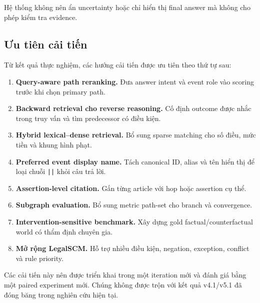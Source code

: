 Hệ thống không nên ẩn uncertainty hoặc chỉ hiển thị final answer mà không
cho phép kiểm tra evidence.

\subsection{Ưu tiên cải tiến}

Từ kết quả thực nghiệm, các hướng cải tiến được ưu tiên theo thứ tự sau:

\begin{enumerate}
    \item \textbf{Query-aware path reranking.}
    Đưa answer intent và event role vào scoring trước khi chọn primary path.

    \item \textbf{Backward retrieval cho reverse reasoning.}
    Cố định outcome được nhắc trong truy vấn và tìm predecessor có điều kiện.

    \item \textbf{Hybrid lexical--dense retrieval.}
    Bổ sung sparse matching cho số điều, mức tiền và khung hình phạt.

    \item \textbf{Preferred event display name.}
    Tách canonical ID, alias và tên hiển thị để loại chuỗi
    \texttt{||} khỏi câu trả lời.

    \item \textbf{Assertion-level citation.}
    Gắn từng article với hop hoặc assertion cụ thể.

    \item \textbf{Subgraph evaluation.}
    Bổ sung metric path-set cho branch và convergence.

    \item \textbf{Intervention-sensitive benchmark.}
    Xây dựng gold factual/counterfactual world có thẩm định chuyên gia.

    \item \textbf{Mở rộng LegalSCM.}
    Hỗ trợ nhiều điều kiện, negation, exception, conflict và rule priority.
\end{enumerate}

Các cải tiến này nên được triển khai trong một iteration mới và đánh giá bằng
một paired experiment mới. Chúng không được trộn với kết quả v4.1/v5.1 đã
đóng băng trong nghiên cứu hiện tại.
